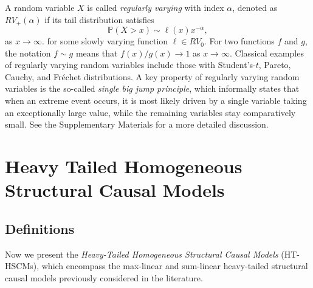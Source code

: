 \documentclass[10pt]{article}
\begin{document}
A random variable $X$ is called \emph{regularly varying} with index $\alpha$, denoted as $RV_+(\alpha)$ if its tail distribution satisfies
\[
\mathbb{P}(X > x) \sim \ell(x) x^{-\alpha}, 
\] as $x \to \infty$.
for some slowly varying function $\ell \in RV_0$.  For two functions $f$ and $g$, the notation 
$f \sim g$ means that $f(x)/g(x) \to 1$ as $x \to \infty$.  
Classical examples of regularly varying random variables include those with Student’s-$t$, Pareto, Cauchy, and Fr\'echet distributions.
A key property of regularly varying random variables is the so-called \textit{single big jump principle}, which informally states that when an extreme event occurs, it is most likely driven by a single variable taking an exceptionally large value, while the remaining variables stay comparatively small. See the Supplementary Materials for a more detailed discussion.


















\section{Heavy Tailed Homogeneous Structural Causal Models}

\subsection{Definitions}
Now we present the \emph{Heavy-Tailed Homogeneous Structural Causal Models} (HT-HSCMs), which encompass the max-linear and sum-linear heavy-tailed structural causal models previously considered in the literature.
\end{document}
